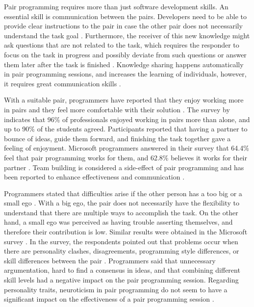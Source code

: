 \documentclass[conference]{IEEEtran}
\begin{document}
Pair programming requires more than just software development skills. An essential skill is communication between the pairs. Developers need to be able to provide clear instructions to the pair in case the other pair does not necessarily understand the task goal \cite{10.1145/2652524.2652529}. Furthermore, the receiver of this new knowledge might ask questions that are not related to the task, which requires the responder to focus on the task in progress and possibly deviate from such questions or answer them later after the task is finished \cite{10.1145/2652524.2652529}. Knowledge sharing happens automatically in pair programming sessions, and increases the learning of individuals, however, it requires great communication skills \cite{10.1145/2652524.2652529}. 

With a suitable pair, programmers have reported that they enjoy working more in pairs and they feel more comfortable with their solution \cite{Williams2000Strengthening}. The survey by \cite{Williams2000Strengthening} indicates that 96\% of professionals enjoyed working in pairs more than alone, and up to 90\% of the students agreed. Participants reported that having a partner to bounce of ideas, guide them forward, and finishing the task together gave a feeling of enjoyment. Microsoft programmers answered in their survey that 64.4\% feel that pair programming works for them, and 62.8\% believes it works for their partner \cite{10.1145/1414004.1414026}. Team building is considered a side-effect of pair programming and has been reported to enhance effectiveness and communication \cite{10.5555/377517.377531}. 

Programmers stated that difficulties arise if the other person has a too big or a small ego \cite{Williams2000Strengthening}. With a big ego, the pair does not necessarily have the flexibility to understand that there are multiple ways to accomplish the task. On the other hand, a small ego was perceived as having trouble asserting themselves, and therefore their contribution is low. Similar results were obtained in the Microsoft survey \cite{10.1145/1414004.1414026}. In the survey, the respondents pointed out that problems occur when there are personality clashes, disagreements, programming style differences, or skill differences between the pair \cite{10.1145/1414004.1414026}. Programmers said that unnecessary argumentation, hard to find a consensus in ideas, and that combining different skill levels had a negative impact on the pair programming session. Regarding personality traits, neuroticism in pair programming do not seem to have a significant impact on the effectiveness of a pair programming session \cite{10.1145/1852786.1852816}.
\end{document}
